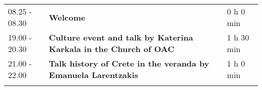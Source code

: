 \begin{longtable}{p{3cm}p{10cm}p{4cm}}
\vspace{1cm}
08.25 - 08.30 & {\bf Welcome} & \hfill 0 h 0 min\\ 
\vspace{1cm}
19.00 - 20.30 & {\bf Culture event and talk by Katerina Karkala in the Church of OAC} & \hfill 1 h 30 min\\ 
\vspace{1cm}
21.00 - 22.00 & {\bf Talk history of Crete in the veranda by Emanuela Larentzakis} & \hfill 1 h 0 min\\ 
\vspace{1cm}
\end{longtable}


